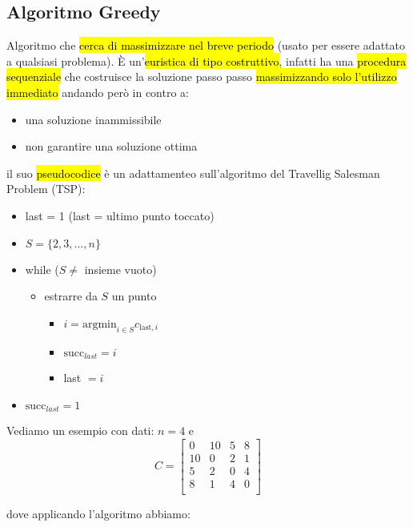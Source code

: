 \subsection{Algoritmo Greedy}

Algoritmo che \hl{cerca di massimizzare nel breve periodo} (usato per essere adattato a qualsiasi problema). È un'\hl{euristica di tipo costruttivo}, infatti ha una \hl{procedura sequenziale} che costruisce la soluzione passo passo \hl{massimizzando solo l'utilizzo immediato} andando però in contro a:

\begin{itemize}
    \item una soluzione inammissibile
    \item non garantire una soluzione ottima
\end{itemize}

il suo \hl{pseudocodice} è un adattamenteo sull'algoritmo del Travellig Salesman Problem (TSP):

\begin{itemize}
    \item[] last = 1 (last = ultimo punto toccato)
    \item[] $S = \{2,3,...,n\}$
    \item[] while ($S \neq$ insieme vuoto)
    \begin{itemize}
        \item[] estrarre da $S$ un punto
        \begin{itemize}
            \item[] $i = \text{argmin}_{i \in S} c_{\text{last}, i}$
            \item[] $\text{succ}_{last} = i$
            \item[] last $= i$
        \end{itemize}
    \end{itemize}
    \item[] $\text{succ}_{last} = 1$ 
\end{itemize}

Vediamo un esempio con dati: $n = 4$ e
$$C=
\left[ {\begin{array}{cccc}
    0 & 10 & 5 & 8 \\
    10 & 0 & 2 & 1 \\
    5 & 2 & 0 & 4 \\
    8 & 1 & 4 & 0 \\
\end{array} } \right]
$$

dove applicando l'algoritmo abbiamo:

